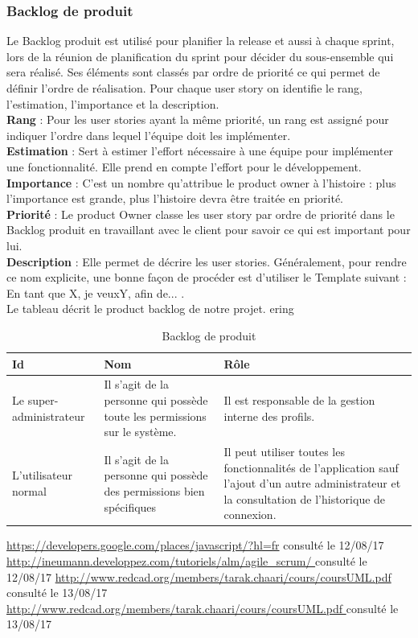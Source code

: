 \documentclass{article}
\begin{document}
\subsubsection{Backlog de produit}
Le Backlog produit est utilisé pour planifier la release et aussi à chaque sprint, lors de la réunion de planification du sprint pour décider du sous-ensemble qui sera réalisé. Ses éléments sont classés par ordre de priorité ce qui permet de définir l’ordre de réalisation.
Pour chaque user story on identifie le rang, l’estimation, l'importance et la description.\\
\textbf{Rang} : Pour les user stories ayant la même priorité, un rang est assigné pour indiquer l'ordre dans lequel l'équipe doit les implémenter.\\
\textbf{Estimation} : Sert à estimer l’effort nécessaire à une équipe pour implémenter une fonctionnalité. Elle prend en compte l’effort pour le développement.\\
\textbf{Importance} : C’est un nombre qu'attribue le product owner à l'histoire : plus l'importance est grande, plus l'histoire devra être traitée en priorité.\\
\textbf{Priorité} : Le product Owner classe les user story par ordre de priorité dans le Backlog produit en travaillant avec le client pour savoir ce qui est important pour lui.\\
\textbf{Description} : Elle permet de décrire les user stories. Généralement, pour rendre ce nom explicite, une bonne façon de procéder est d'utiliser le Template suivant :  \guillemotleft En tant que X, je veuxY, afin de... \guillemotright. \\
Le tableau décrit le product backlog de notre projet.
ering
\begin{table}[H]
\centering
\label{tab:tab2} 
 \begin{tabularx}{\textwidth}{|X|X|X|}
\hline
\bfseries{ Id} &\bfseries{ Nom} &\bfseries{ Rôle} \\ \hline
Le super-administrateur& Il s’agit de la personne qui possède toute les permissions sur le système. &Il est responsable de la gestion interne des profils.\\
\hline
L'utilisateur normal & Il s'agit de la personne qui possède des permissions bien spécifiques & Il peut utiliser toutes les fonctionnalités de l'application sauf l'ajout d'un autre administrateur et la consultation de l'historique de connexion.\\
\hline
\end{tabularx}
\caption[tableau2 : Backlog de produit]{Backlog de produit}
\end{table}
\cleardoublepage

\begin{thebibliography}{1}
 \textcolor{blue}{\url{https://developers.google.com/places/javascript/?hl=fr}} consulté le 12/08/17
 \textcolor{blue}{\url{ http://ineumann.developpez.com/tutoriels/alm/agile_scrum/ }} consulté le 12/08/17
 \textcolor{blue}{\url{http://www.redcad.org/members/tarak.chaari/cours/coursUML.pdf }} consulté le 13/08/17
 \textcolor{blue}{\url{http://www.redcad.org/members/tarak.chaari/cours/coursUML.pdf }} consulté le 13/08/17
\end{thebibliography}
\end{document}
